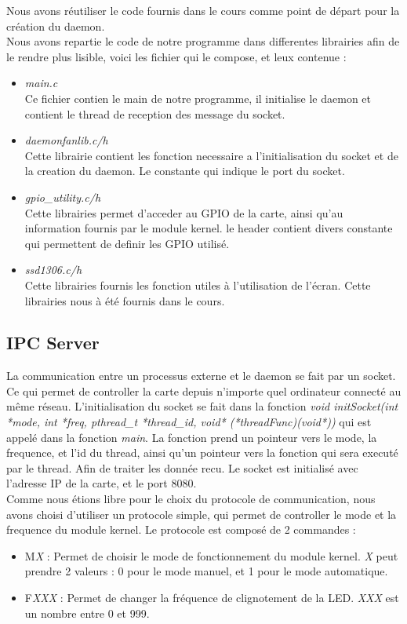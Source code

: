 \documentclass[
	a4paper, %
	10pt, %
]{CSUniSchoolLabReport}
\begin{document}
Nous avons réutiliser le code fournis dans le cours comme point de départ pour la création du daemon. \\

Nous avons repartie le code de notre programme dans differentes librairies afin de le rendre plus lisible, voici les fichier qui le compose, et leux contenue : \\
\begin{itemize}
	\item \textit{main.c}\\
	Ce fichier contien le main de notre programme, il initialise le daemon et contient le thread de reception des message du socket.
	\item \textit{daemonfanlib.c/h}\\
	Cette librairie contient les fonction necessaire a l'initialisation du socket et de la creation du daemon. Le constante qui indique le port du socket.
	\item \textit{gpio\_utility.c/h}\\
	Cette librairies permet d'acceder au GPIO de la carte, ainsi qu'au information fournis par le module kernel. le header contient divers constante qui permettent de definir les GPIO utilisé.
	\item \textit{ssd1306.c/h}\\
	Cette librairies fournis les fonction utiles à l'utilisation de l'écran. Cette librairies nous à été fournis dans le cours.

\end{itemize}
\subsection{IPC Server}\label{IPCServer}
La communication entre un processus externe et le daemon se fait par un socket. 
Ce qui permet de controller la carte depuis n'importe quel ordinateur connecté au même réseau. 
L'initialisation du socket se fait dans la fonction \textit{void initSocket(int *mode, int *freq, pthread\_t *thread\_id, void* (*threadFunc)(void*))} qui est appelé dans la fonction \textit{main}.
La fonction prend un pointeur vers le mode, la frequence, et l'id du thread, ainsi qu'un pointeur vers la fonction qui sera executé par le thread. Afin de traiter les donnée recu.
Le socket est initialisé avec l'adresse IP de la carte, et le port 8080. \\

Comme nous étions libre pour le choix du protocole de communication, nous avons choisi d'utiliser un protocole simple, qui permet de controller le mode et la frequence du module kernel.
Le protocole est composé de 2 commandes : \\
\begin{itemize}
	\item M\textit{X} : Permet de choisir le mode de fonctionnement du module kernel. \textit{X} peut prendre 2 valeurs : 0 pour le mode manuel, et 1 pour le mode automatique.
	\item F\textit{XXX} : Permet de changer la fréquence de clignotement de la LED. \textit{XXX} est un nombre entre 0 et 999.
\end{itemize}
\end{document}

